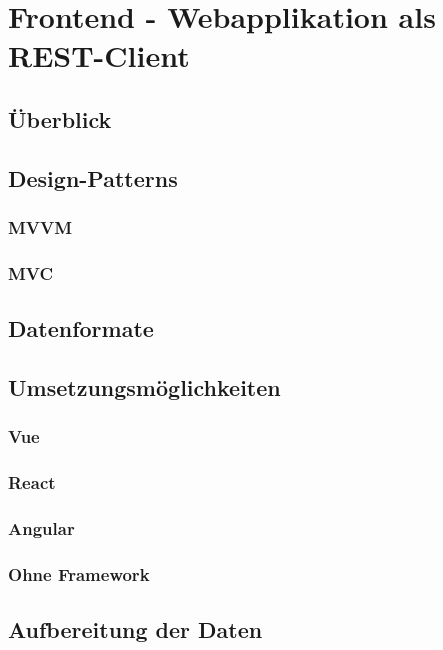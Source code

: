 \section{Frontend - Webapplikation als REST-Client}
\subsection{Überblick}
\subsection{Design-Patterns}
\subsubsection{MVVM}
\subsubsection{MVC}
\subsection{Datenformate}
\subsection{Umsetzungsmöglichkeiten}
\subsubsection{Vue}
\subsubsection{React}
\subsubsection{Angular}
\subsubsection{Ohne Framework}
\subsection{Aufbereitung der Daten}